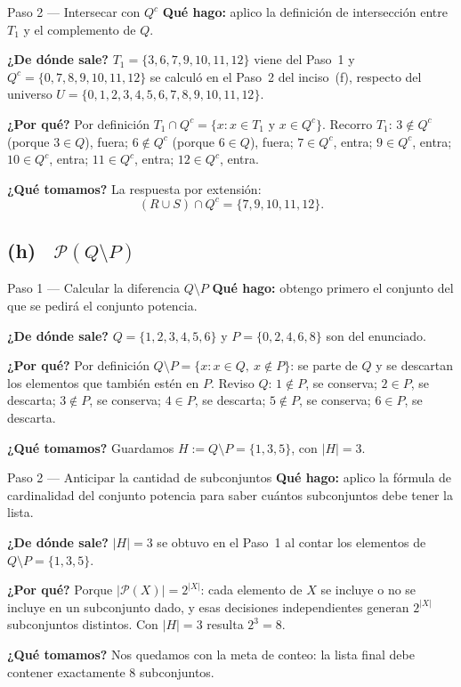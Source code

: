 \documentclass[11pt]{article}
\begin{document}
\begin{paso}{Paso 2 --- Intersecar con $Q^{c}$}
\textbf{Qué hago:} aplico la definición de intersección entre $T_1$ y el complemento de $Q$.

\textbf{¿De dónde sale?} $T_1=\{3,6,7,9,10,11,12\}$ viene del Paso~1 y
$Q^{c}=\{0,7,8,9,10,11,12\}$ se calculó en el Paso~2 del inciso~(f), respecto del universo
$U=\{0,1,2,3,4,5,6,7,8,9,10,11,12\}$.

\textbf{¿Por qué?} Por definición $T_1\cap Q^{c}=\{x: x\in T_1 \text{ y } x\in Q^{c}\}$.
Recorro $T_1$: $3\notin Q^{c}$ (porque $3\in Q$), fuera; $6\notin Q^{c}$ (porque $6\in Q$),
fuera; $7\in Q^{c}$, entra; $9\in Q^{c}$, entra; $10\in Q^{c}$, entra; $11\in Q^{c}$, entra;
$12\in Q^{c}$, entra.

\textbf{¿Qué tomamos?} La respuesta por extensión:
\[
(R\cup S)\cap Q^{c}=\{7,9,10,11,12\}.
\]
\end{paso}

\subsection*{(h) \ $\mathcal{P}(Q\setminus P)$}

\begin{paso}{Paso 1 --- Calcular la diferencia $Q\setminus P$}
\textbf{Qué hago:} obtengo primero el conjunto del que se pedirá el conjunto potencia.

\textbf{¿De dónde sale?} $Q=\{1,2,3,4,5,6\}$ y $P=\{0,2,4,6,8\}$ son del enunciado.

\textbf{¿Por qué?} Por definición $Q\setminus P=\{x: x\in Q,\ x\notin P\}$: se parte de $Q$ y
se descartan los elementos que también estén en $P$. Reviso $Q$: $1\notin P$, se conserva;
$2\in P$, se descarta; $3\notin P$, se conserva; $4\in P$, se descarta; $5\notin P$, se
conserva; $6\in P$, se descarta.

\textbf{¿Qué tomamos?} Guardamos $H:=Q\setminus P=\{1,3,5\}$, con $|H|=3$.
\end{paso}

\begin{paso}{Paso 2 --- Anticipar la cantidad de subconjuntos}
\textbf{Qué hago:} aplico la fórmula de cardinalidad del conjunto potencia para saber cuántos
subconjuntos debe tener la lista.

\textbf{¿De dónde sale?} $|H|=3$ se obtuvo en el Paso~1 al contar los elementos de
$Q\setminus P=\{1,3,5\}$.

\textbf{¿Por qué?} Porque $|\mathcal{P}(X)|=2^{|X|}$: cada elemento de $X$ se incluye o no se
incluye en un subconjunto dado, y esas decisiones independientes generan $2^{|X|}$
subconjuntos distintos. Con $|H|=3$ resulta $2^{3}=8$.

\textbf{¿Qué tomamos?} Nos quedamos con la meta de conteo: la lista final debe contener
exactamente $8$ subconjuntos.
\end{paso}
\end{document}

